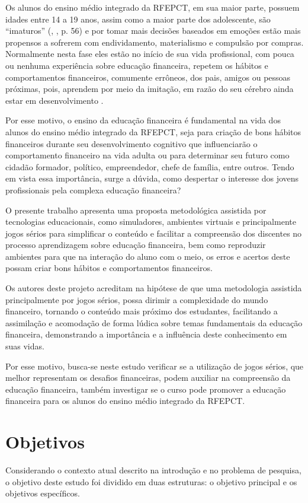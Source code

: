 Os alunos do ensino médio integrado da RFEPCT, em sua maior parte, possuem idades entre 14 a 19 anos, assim como a maior parte dos adolescente, são “imaturos” (\citeauthor{tiba2005}, \citeyear{tiba2005}, p. 56) e por tomar mais decisões baseados em emoções estão mais propensos a sofrerem com endividamento, materialismo e compulsão por compras. Normalmente nesta fase eles estão no início de sua vida profissional, com pouca ou nenhuma experiência sobre educação financeira, repetem os hábitos e comportamentos financeiros, comumente errôneos, dos pais, amigos ou pessoas próximas, pois, aprendem por meio da imitação, em razão do seu cérebro ainda estar em desenvolvimento \cite{herculano2005}.

Por esse motivo, o ensino da educação financeira é fundamental na vida dos alunos do ensino médio integrado da RFEPCT, seja para criação de bons hábitos financeiros durante seu desenvolvimento cognitivo que influenciarão o comportamento financeiro na vida adulta ou para determinar seu futuro como cidadão formador, político, empreendedor, chefe de família, entre outros. Tendo em vista essa importância, surge a dúvida, como despertar o interesse dos jovens profissionais pela complexa educação financeira?

O presente trabalho apresenta uma proposta metodológica assistida por tecnologias educacionais, como simuladores, ambientes virtuais e principalmente jogos sérios para simplificar o conteúdo e facilitar a compreensão dos discentes no processo aprendizagem sobre educação financeira, bem como reproduzir ambientes para que na interação do aluno com o meio, os erros e acertos deste possam criar bons hábitos e comportamentos financeiros.

Os autores deste projeto acreditam na hipótese de que uma metodologia assistida principalmente por jogos sérios, possa dirimir a complexidade do mundo financeiro, tornando o conteúdo mais próximo dos estudantes, facilitando a assimilação e acomodação de forma lúdica sobre temas fundamentais da educação financeira, demonstrando a importância e a influência deste conhecimento em suas vidas.

Por esse motivo, busca-se neste estudo verificar se a utilização de jogos sérios, que melhor representam os desafios financeiras, podem auxiliar na compreensão da educação financeira, também investigar se o curso pode promover a educação financeira para os alunos do ensino médio integrado da RFEPCT.

\section{Objetivos}
Considerando o contexto atual descrito na introdução e no problema de pesquisa, o objetivo deste estudo foi dividido em duas estruturas: o objetivo principal e os objetivos específicos.

